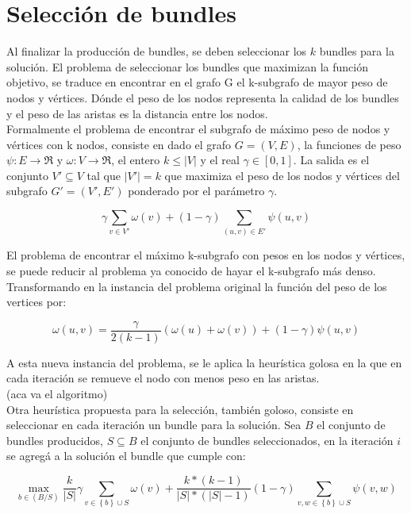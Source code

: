 \section{Selección de bundles}
Al finalizar la producción de bundles, se deben seleccionar los $k$ bundles para la solución. El problema de seleccionar los bundles que maximizan la función objetivo, se traduce en encontrar en el grafo G el k-subgrafo de mayor peso de nodos y vértices. Dónde el peso de los nodos representa la calidad de los bundles y el peso de las aristas es la distancia entre los nodos.\\
Formalmente el problema de encontrar el subgrafo de máximo peso de nodos y vértices con k nodos, consiste en dado el grafo $ G = (V,E) $, la funciones de peso $\psi : E \rightarrow \Re$ y $\omega : V \rightarrow \Re$, el entero $ k \leq |V| $ y el real $\gamma \in [0,1]$. La salida es el conjunto $V' \subseteq V$ tal que $|V'| = k$ que maximiza el peso de los nodos y vértices del subgrafo $G' = (V', E')$ ponderado por el parámetro $\gamma$.

\begin{equation}
\gamma \sum_{v \in V'}{\omega(v)} + (1 - \gamma) \sum_{(u,v) \in E'}{\psi(u,v)}
\end{equation}

El problema de encontrar el máximo k-subgrafo con pesos en los nodos y vértices, se puede reducir al problema ya conocido de hayar el k-subgrafo más denso\cite{SubgraphProblem}. Transformando en la instancia del problema original la función del peso de los vertices por:
 
\begin{equation}
\omega(u,v) = \dfrac{\gamma}{2( k - 1)} (\omega(u) + \omega(v)) + (1 - \gamma)\psi(u,v) 
\end{equation}

A esta nueva instancia del problema, se le aplica la heurística golosa en la que en cada iteración se remueve el nodo con menos peso en las aristas.\\

(aca va el algoritmo)\\

Otra heurística propuesta para la selección, también goloso, consiste en seleccionar en cada iteración un bundle para la solución. Sea $B$ el conjunto de bundles producidos, $S \subseteq B$ el conjunto de bundles seleccionados, en la iteración $i$ se agregá a la solución el bundle que cumple con:

\begin{equation}
\max_{b \in (B/S)}{\dfrac{k}{|S|}} \gamma \sum_{v \in \left\{b\right\} \cup S}{\omega(v)} + \dfrac{k * (k-1)}{|S| * (|S|-1)} (1-\gamma) \sum_{v,w \in \left\{b\right\} \cup S}{\psi(v,w)}
\end{equation}

